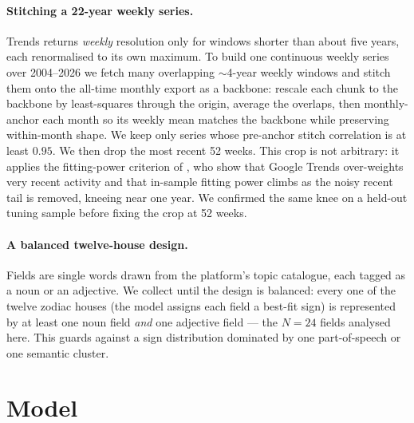 \documentclass[11pt]{artaquest}
\newcommand{\headlineN}{24}            %
\begin{document}
\paragraph{Stitching a 22-year weekly series.}
Trends returns \emph{weekly} resolution only for windows shorter than about five years, each renormalised
to its own maximum. To build one continuous weekly series over 2004--2026 we fetch many overlapping
$\sim$4-year weekly windows and stitch them onto the all-time monthly export as a backbone: rescale each
chunk to the backbone by least-squares through the origin, average the overlaps, then monthly-anchor each
month so its weekly mean matches the backbone while preserving within-month shape. We keep only series
whose pre-anchor stitch correlation is at least $0.95$. We then drop the most recent \num{52} weeks. This crop
is not arbitrary: it applies the fitting-power criterion of \citet{ashrafnejad2026recency}, who show that
Google Trends over-weights very recent activity and that in-sample fitting power climbs as the noisy
recent tail is removed, kneeing near one year. We confirmed the same knee on a held-out tuning sample
before fixing the crop at \num{52} weeks.

\paragraph{A balanced twelve-house design.}
Fields are single words drawn from the platform's topic catalogue, each tagged as a noun or an adjective.
We collect until the design is balanced: every one of the twelve zodiac houses (the model assigns each
field a best-fit sign) is represented by at least one noun field \emph{and} one adjective field --- the
$N=\headlineN{}$ fields analysed here. This guards against a sign distribution dominated by one
part-of-speech or one semantic cluster.

\section{Model}
\label{sec:model}
\end{document}
